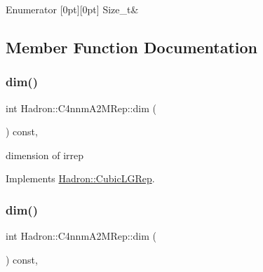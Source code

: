 \begin{DoxyEnumFields}{Enumerator}
[0pt][0pt]{}\mbox{\label{structHadron_1_1C4nnmA2MRep_a94727dd23779377c4735feaa5cd3dc11a2052301a99035f31775be761eef20479}} 
Size\+\_\+t&\\
\hline

\end{DoxyEnumFields}


\subsection{Member Function Documentation}
\mbox{\label{structHadron_1_1C4nnmA2MRep_a5c3be88143a9c05ede78e8d988d21c52}} 
\subsubsection{\texorpdfstring{dim()}{dim()}\hspace{0.1cm}{\footnotesize\ttfamily [1/3]}}
{\footnotesize\ttfamily int Hadron\+::\+C4nnm\+A2\+M\+Rep\+::dim (\begin{DoxyParamCaption}{ }\end{DoxyParamCaption}) const\hspace{0.3cm}{\ttfamily [inline]}, {\ttfamily [virtual]}}

dimension of irrep 

Implements \mbox{\hyperlink{structHadron_1_1CubicLGRep_a3acbaea26503ed64f20df693a48e4cdd}{Hadron\+::\+Cubic\+L\+G\+Rep}}.

\mbox{\label{structHadron_1_1C4nnmA2MRep_a5c3be88143a9c05ede78e8d988d21c52}} 
\subsubsection{\texorpdfstring{dim()}{dim()}\hspace{0.1cm}{\footnotesize\ttfamily [2/3]}}
{\footnotesize\ttfamily int Hadron\+::\+C4nnm\+A2\+M\+Rep\+::dim (\begin{DoxyParamCaption}{ }\end{DoxyParamCaption}) const\hspace{0.3cm}{\ttfamily [inline]}, {\ttfamily [virtual]}}

